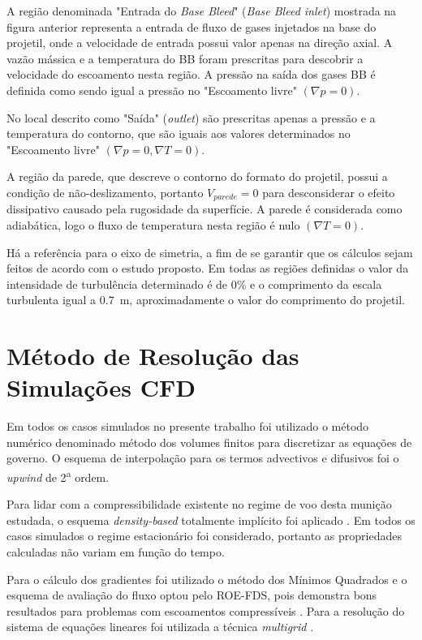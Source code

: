 A região denominada "Entrada do \textit{Base Bleed}"{} (\textit{Base Bleed inlet}) mostrada na figura anterior representa a entrada de fluxo de gases injetados na base do projetil, onde a velocidade de entrada possui valor apenas na direção axial. A vazão mássica e a temperatura do BB foram prescritas para descobrir a velocidade do escoamento nesta região. A pressão na saída dos gases BB é definida como sendo igual a pressão no "Escoamento livre"{} $\left(\nabla p = 0\right)$.

No local descrito como "Saída"{} (\textit{outlet}) são prescritas apenas a pressão e a temperatura do contorno, que são iguais aos valores determinados no "Escoamento livre"{} $\left(\nabla p = 0, \nabla T = 0\right)$.

A região da parede, que descreve o contorno do formato do projetil, possui a condição de não-deslizamento, portanto $V_{parede} = 0$ para desconsiderar o efeito dissipativo causado pela rugosidade da superfície. A parede é considerada como adiabática, logo o fluxo de temperatura nesta região é nulo $\left(\nabla T = 0\right)$.

Há a referência para o eixo de simetria, a fim de se garantir que os cálculos sejam feitos de acordo com o estudo proposto. Em todas as regiões definidas o valor da intensidade de turbulência determinado é de 0\% e o comprimento da escala turbulenta igual a \qty{0,7}{\metre}, aproximadamente o valor do comprimento do projetil.

\section{Método de Resolução das Simulações CFD}\label{sec:metodo-resolucao-cfd}

Em todos os casos simulados no presente trabalho foi utilizado o método numérico denominado método dos volumes finitos \cite{McDonald1971,MacComarck&Paulay1972} para discretizar as equações de governo. O esquema de interpolação para os termos advectivos e difusivos foi o \textit{upwind} de 2\textsuperscript{a} ordem. 

Para lidar com a compressibilidade existente no regime de voo desta munição estudada, o esquema \textit{density-based} totalmente implícito foi aplicado \cite{Weiss1995PreconditioningAT,Weiss1997IMPLICITSO,Weiss1999ImplicitSO}. Em todos os casos simulados o regime estacionário foi considerado, portanto as propriedades calculadas não variam em função do tempo. 

Para o cálculo dos gradientes foi utilizado o método dos Mínimos Quadrados e o esquema de avaliação do fluxo optou pelo ROE-FDS, pois demonstra bons resultados para problemas com escoamentos compressíveis \cite{nicolas-perez_accuracy_2017}. Para a resolução do sistema de equações lineares foi utilizada a técnica \textit{multigrid} \cite{Hutchinson1986}.

